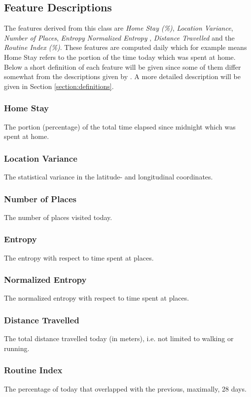 \subsection{Feature Descriptions}
The features derived from this class are \textit{Home Stay (\%)}, \textit{Location Variance}, \textit{Number of Places}, \textit{Entropy} \textit{Normalized Entropy} , \textit{Distance Travelled} and the \textit{Routine Index (\%)}. These features are computed daily which for example means Home Stay refers to the portion of the time today which was spent at home. Below a short definition of each feature will be given since some of them differ somewhat from the descriptions given by \cite{Canzian2015,Saeb2015}. A more detailed description will be given in Section \ref{section:definitions}.

\subsubsection*{Home Stay}
The portion (percentage) of the total time elapsed since midnight which was spent at home. 

\subsubsection*{Location Variance}
The statistical variance in the latitude- and longitudinal coordinates.

\subsubsection*{Number of Places}
The number of places visited today.

\subsubsection*{Entropy}
The entropy with respect to time spent at places.

\subsubsection*{Normalized Entropy}
The normalized entropy with respect to time spent at places.

\subsubsection*{Distance Travelled}
The total distance travelled today (in meters), i.e. not limited to walking or running.

\subsubsection*{Routine Index}
The percentage of today that overlapped with the previous, maximally, 28 days.



